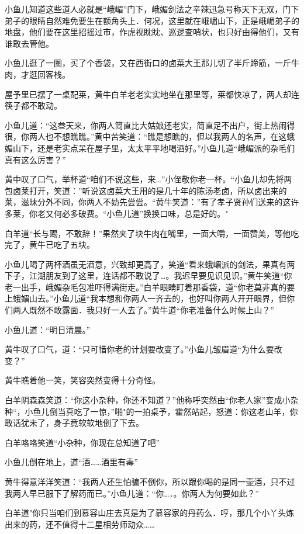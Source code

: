 \documentclass[12pt,oneside]{book}
\begin{document}
小鱼儿知道这些道人必就是``峨嵋''门下，峨媚剑法之辛辣迅急号称天下无双，门下弟子的眼睛自然难免要生在额角头上．何况，这里就在峨嵋山下，正是峨嵋弟子的地盘，他们要在这里招摇过市，作虎视眈眈、巡逻查哨状，也只好由得他们，又有谁敢去管他。

小鱼儿逛了一圈，买了个香袋，又在西街口的卤菜大王那儿切了半斤蹄筋，一斤牛肉，才逛回客栈。

屋予里已摆了一桌配莱，黄牛白羊老老实实地坐在那里等，莱都快凉了，两人却连筷子都不敢动。

小鱼儿道：``这叁天来，你两人简直比大姑娘还老实，简直足不出户，街上热闹得很，你两人也不想瞧瞧。''黄中苦笑道：``瞧是想瞧的，但以我两人的名声，在这蛾媚山下，还是老实点呆在屋子里，太太平平地喝酒好。''小鱼儿道``峨嵋派的杂毛们真有这么厉害？''

黄中叹了口气，举杯道``咱们不说这些，来\ldots{}''小侄敬你老一杯。``小鱼儿却先将两包卤莱打开，笑道：''听说这卤菜大王用的是几十年的陈汤老卤，所以卤出来的莱，滋昧分外不同，你两人不妨先尝尝。``黄牛笑道：''有了孝子贤孙们送来的这许多莱，你老又何必多破费。``小鱼儿道''换换口味，总是好的。"

白羊道``长与赐，不敢辞！''果然夹了块牛肉在嘴里，一面大嚼，一面赞美，等他吃完了，黄牛已吃了五块。

小鱼儿喝了两杯酒虽无酒意，兴致却更高了，笑道``看来蛾嵋派的剑法，果真有两下子，江湖朋友到了这里，连话都不敢说了\ldots。我迟早要见识见识。''黄牛笑道``你老一出手，峨媚杂毛包准吓得满街走。''白羊眼睛盯着那香袋，道``你老莫非真的要上蛾媚山去。''小鱼儿道``我本想和你两人一齐去的，也好叫你两人开开眼界，但你们两人既然不敢露面．我只好一人去了。''黄牛道``你老准备什么时候上山？''

小鱼儿道：``明日清晨。''

黄牛叹了口气，道：``只可惜你老的计划要改变了。''小鱼儿皱眉道``为什么要改变？''

黄牛瞧着他一笑，笑容突然变得十分奇怪。

白羊阴森森笑道：``你这小杂种，你还不知道？''他称呼突然由``你老人家''变成小杂种``，小鱼儿倒当真吃了一惊，''啪"的一拍桌予，霍然站起，怒道：你这老山羊，你敢话犹未了，身子竟软软地倒了下去。

白羊咯咯笑道``小杂种，你现在总知道了吧''

小鱼儿倒在地上，道``酒\ldots\ldots 酒里有毒''

黄牛得意洋洋笑道：``我两人还生怕骗不倒你，所以跟你喝的是同一壶酒，只不过我两人早已服下了解药而已。''小鱼儿道：``你\ldots．。你两人为何要如此？''

白羊道"你只当咱们到慕容山庄去真是为了慕容家的丹药么．哼，那几个小丫头炼出来的药，还不值得十二星相劳师动众\ldots\ldots{}
\end{document}
